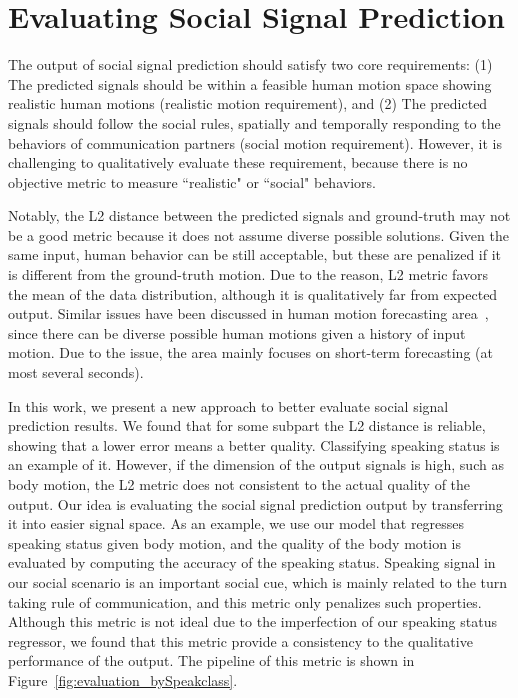 
\section{Evaluating Social Signal Prediction}
\label{section:evaluation}
The output of social signal prediction should satisfy two core requirements: (1) The predicted signals should be within a feasible human motion space showing realistic human motions (realistic motion requirement), and (2) The predicted signals should follow the social rules, spatially and temporally responding to the behaviors of communication partners (social motion requirement). However, it is challenging to qualitatively evaluate these requirement, because there is no objective metric to measure ``realistic" or ``social" behaviors. %

Notably, the L2 distance between the predicted signals and ground-truth may not be a good metric because it does not assume diverse possible solutions. Given the same input, human behavior can be still acceptable, but these are penalized if it is different from the ground-truth motion. Due to the reason, L2 metric favors the mean of the data distribution, although it is qualitatively far from expected output. Similar issues have been discussed in human motion forecasting area~\cite{mnih2012conditional, Fragkiadaki_2015_ICCV, jain2016structural}, since there can be diverse possible human motions given a history of input motion. Due to the issue, the area mainly focuses on short-term forecasting (at most several seconds).


In this work, we present a new approach to better evaluate social signal prediction results. We found that for some subpart the L2 distance is reliable, showing that a lower error means a better quality. Classifying speaking status is an example of it. However, if the dimension of the output signals is high, such as body motion, the L2 metric does not consistent to the actual quality of the output. Our idea is evaluating the social signal prediction output by transferring it into easier signal space. As an example, we use our model that regresses speaking status given body motion, and the quality of the body motion is evaluated by computing the accuracy of the speaking status. Speaking signal in our social scenario is an important social cue, which is mainly related to the turn taking rule of communication, and this metric only penalizes such properties. Although this metric is not ideal due to the imperfection of our speaking status regressor, we found that this metric provide a consistency to the qualitative performance of the output. The pipeline of this metric is shown in Figure~\ref{fig:evaluation_bySpeakclass}.



